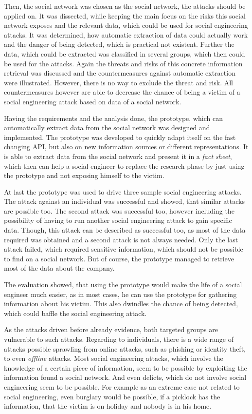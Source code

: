 Then, the \Twitter{} social network was chosen as the social network, the
attacks should be applied on. It was dissected, while keeping the main focus on the
risks this social network exposes and the relevant data, which could be used
for social engineering attacks. It was determined, how automatic extraction of
data could actually work and the danger of being detected, which is practical
not existent. Further the data, which could be extracted was classified in
several groups, which then could be used for the attacks. Again the threats and
risks of this concrete information retrieval was discussed and the
countermeasures against automatic extraction were illustrated. However, there
is no way to exclude the threat and risk. All countermeasures however are able
to decrease the chance of being a victim of a social engineering attack based
on data of a social network.

Having the requirements and the analysis done, the prototype, which can
automatically extract data from the \Twitter{} social network was designed and
implemented. The prototype was developed to quickly adapt itself on the fast
changing \Twitter{} API, but also on new information sources or different
representations. It is able to extract data from the social network and present
it in a \textit{fact sheet}, which then can help a social engineer to replace
the research phase by just using the prototype and not exposing himself to the
victim.

At last the prototype was used to drive three sample social engineering attacks.
The attack against an individual was successful and showed, that similar
attacks are possible too. The second attack was successful too, however
including the possibility of having to run another social engineering attack to
gain specific data. Though, this attack can be described as successful too, as
most of the data required was obtained and a second attack is not always
needed. Only the last attack failed, which required sensitive information,
which should not be possible to find on a social network. But of course, the
prototype managed to retrieve most of the data about the company.

The evaluation showed, that using the prototype would make the life of a social
engineer much easier, as in most cases, he can use the prototype for gathering
information about his victim. This also dwindles the chance of being detected,
which could baffle the social engineering attack.

As the attacks driven before already evidence, both targeted groups are
vulnerable to such attacks. Regarding to individuals, there is a wide range
of attacks possible sprawling from online attacks, such as phishing or identity
theft, to even \textit{offline} attacks. Most social engineering attacks, which
involve the knowledge of a certain piece of information, seem to be possible by
exploiting the information found a social network. And even delicts, which do
not involve social engineering seem to be possible. For example as an extreme
case not related to social engineering, even burglary would be possible, if a
picklock has the information, that the victim is on holiday and nobody is in his
home.

